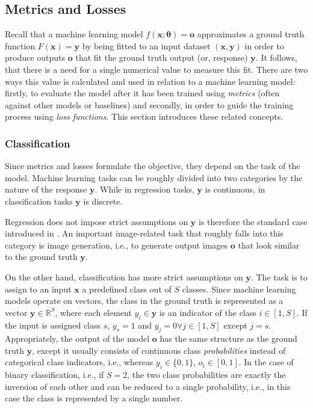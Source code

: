 \subsection{Metrics and Losses}
\label{subsec:bg.losses}
Recall that a machine learning model $f(\mathbf{x};\boldsymbol{\theta})=\mathbf{o}$ approximates a ground truth function $F(\textbf{x})=\textbf{y}$ by being fitted to an input dataset $(\mathbf{x},\mathbf{y})$ in order to produce outputs $\mathbf{o}$ that fit the ground truth output (or, response) $\mathbf{y}$. It follows, that there is a need for a single numerical value to measure this fit. There are two ways this value is calculated and used in relation to a machine learning model: firstly, to evaluate the model after it has been trained using \emph{metrics} (often against other models or baselines) and secondly, in order to guide the training process using \emph{loss functions}. This section introduces these related concepts.

\subsubsection{Classification}
\label{subsubsec:classification}
Since metrics and losses formulate the objective, they depend on the task of the model. Machine learning tasks can be roughly divided into two categories by the nature of the response $\mathbf{y}$. While in regression tasks, $\mathbf{y}$ is continuous, in classification tasks $\mathbf{y}$ is discrete.

Regression does not impose strict assumptions on $\mathbf{y}$ is therefore the standard case introduced in . An important image-related task that roughly falls into this category is image generation, i.e., to generate output images $\mathbf{o}$ that look similar to the ground truth $\mathbf{y}$.

On the other hand, classification has more strict assumptions on $\mathbf{y}$. The task is to assign to an input $\mathbf{x}$ a predefined class out of $S$ classes. Since machine learning models operate on vectors, the class in the ground truth is represented as a vector $\mathbf{y}\in\mathbb{R}^S$, where each element $y_i\in\mathbf{y}$ is an indicator of the class $i\in[1,S]$. If the input is assigned class $s$, $y_s=1$ and $y_j=0\forall j\in[1,S]$ except $j=s$. Appropriately, the output of the model $\mathbf{o}$ has the same structure as the ground truth $\mathbf{y}$, except it usually consists of continuous class \emph{probabilities} instead of categorical class indicators, i.e., whereas $y_i\in\{0,1\}$, $o_i\in[0,1]$. In the case of binary classification, i.e., if $S=2$, the two class probabilities are exactly the inversion of each other and can be reduced to a single probability, i.e., in this case the class is represented by a single number.


